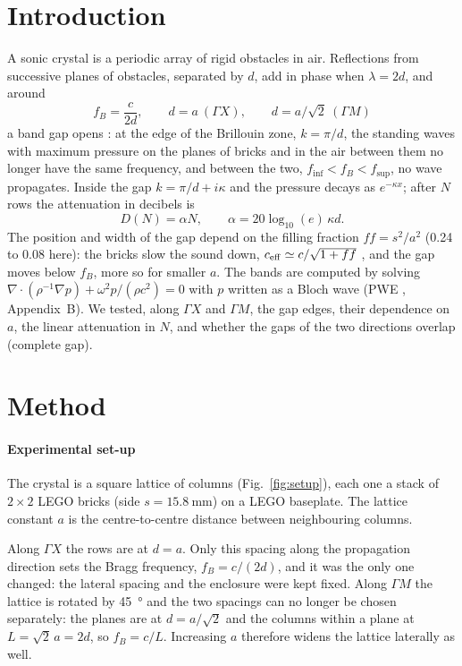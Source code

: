 \documentclass[9pt,a4paper,twocolumn]{extarticle}
\newcommand{\GX}{\ensuremath{\Gamma X}}
\newcommand{\GM}{\ensuremath{\Gamma M}}
\newcommand{\finf}{\ensuremath{f_{\mathrm{inf}}}}
\newcommand{\fsup}{\ensuremath{f_{\mathrm{sup}}}}
\begin{document}
\section{Introduction}
A sonic crystal is a periodic array of rigid obstacles in air. Reflections from successive planes of obstacles, separated by $d$, add in phase when $\lambda=2d$, and around
\begin{equation}
f_B=\frac{c}{2d},\qquad d=a\ (\GX),\qquad d=a/\sqrt2\ (\GM)
\end{equation}
a band gap opens \cite{mart,sanchez}: at the edge of the Brillouin zone, $k=\pi/d$, the standing waves with maximum pressure on the planes of bricks and in the air between them no longer have the same frequency, and between the two, $\finf<f_B<\fsup$, no wave propagates. Inside the gap $k=\pi/d+i\kappa$ and the pressure decays as $e^{-\kappa x}$; after $N$ rows the attenuation in decibels is
\begin{equation}
D(N)=\alpha N,\qquad \alpha=20\log_{10}(e)\,\kappa d.
\end{equation}
The position and width of the gap depend on the filling fraction $ff=s^2/a^2$ (0.24 to 0.08 here): the bricks slow the sound down, $c_{\rm eff}\simeq c/\sqrt{1+ff}$ \cite{krokhin}, and the gap moves below $f_B$, more so for smaller $a$. The bands are computed by solving $\nabla\!\cdot(\rho^{-1}\nabla p)+\omega^2p/(\rho c^2)=0$ with $p$ written as a Bloch wave (PWE \cite{kush}, Appendix~B). We tested, along \GX{} and \GM, the gap edges, their dependence on $a$, the linear attenuation in $N$, and whether the gaps of the two directions overlap (complete gap).

\section{Method}

\paragraph{Experimental set-up}
The crystal is a square lattice of columns (Fig.~\ref{fig:setup}), each one a stack of $2\times2$ LEGO bricks (side $s = \SI{15.8}{\milli\metre}$) on a LEGO baseplate. The lattice constant $a$ is the centre-to-centre distance between neighbouring columns.

Along $\Gamma X$ the rows are at $d = a$. Only this spacing along the propagation direction sets the Bragg frequency, $f_B = c/(2d)$, and it was the only one changed: the lateral spacing and the enclosure were kept fixed. Along $\Gamma M$ the lattice is rotated by \SI{45}{\degree} and the two spacings can no longer be chosen separately: the planes are at $d = a/\sqrt{2}$ and the columns within a plane at $L = \sqrt{2}\,a = 2d$, so $f_B = c/L$. Increasing $a$ therefore widens the lattice laterally as well.
\end{document}

